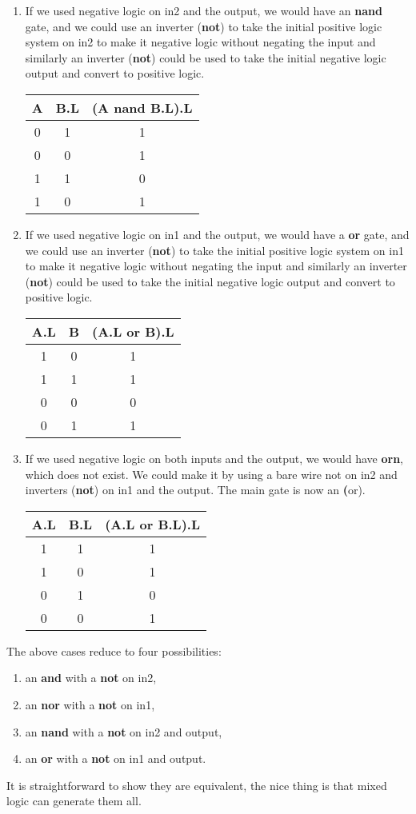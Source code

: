 \begin{example}
\begin{enumerate}
\item If we used negative logic on in2 and the output, we would have an \textbf{nand} gate, and we could use an inverter (\textbf{not}) to take the initial positive logic system on in2 to make it negative logic without negating the input and similarly an inverter (\textbf{not}) could be used to take the initial negative logic output and convert to positive logic.

\begin{tabular}{c|c||c}
A & B.L & (A nand B.L).L \\\hline
0 & 1 & 1 \\
0 & 0 & 1 \\
1 & 1 & 0 \\
1 & 0 & 1 \\
\end{tabular}
\item If we used negative logic on in1 and the output, we would have a \textbf{or} gate, and we could use an inverter (\textbf{not}) to take the initial positive logic system on in1 to make it negative logic without negating the input and similarly an inverter (\textbf{not}) could be used to take the initial negative logic output and convert to positive logic.

\begin{tabular}{c|c||c}
A.L & B & (A.L or B).L \\\hline
1 & 0 & 1 \\
1 & 1 & 1 \\
0 & 0 & 0 \\
0 & 1 & 1 \\
\end{tabular}
\item If we used negative logic on both inputs and the output, we would have \textbf{orn}, which does not exist.  We could make it by using a bare wire not on in2 and inverters (\textbf{not}) on in1 and the output.  The main gate is now an \textbf(or).

\begin{tabular}{c|c||c}
A.L & B.L & (A.L or B.L).L \\\hline
1 & 1 & 1 \\
1 & 0 & 1 \\
0 & 1 & 0 \\
0 & 0 & 1 \\
\end{tabular}
\end{enumerate}

The above cases reduce to four possibilities:
\begin{enumerate}
\item an \textbf{and} with a \textbf{not} on in2,
\item an \textbf{nor} with a \textbf{not} on in1,
\item an \textbf{nand} with a \textbf{not} on in2 and output,
\item an \textbf{or} with a \textbf{not} on in1 and output.
\end{enumerate}
It is straightforward to show they are equivalent, the nice thing is that mixed logic can generate them all.
\end{example}

